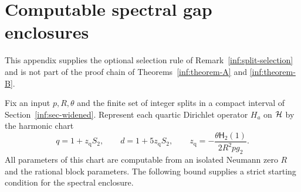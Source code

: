 \section{Computable spectral gap enclosures}\label{inf:sec-gap-enclosures}

This appendix supplies the optional selection rule of
Remark~\ref{inf:split-selection} and is not part of the proof
chain of Theorems~\ref{inf:theorem-A} and \ref{inf:theorem-B}.

Fix an input $p,R,\theta$ and the finite set of integer splits in a
compact interval of Section~\ref{inf:sec-widened}. Represent each
quartic Dirichlet operator $H_a$ on $\mathcal{H}$ by the harmonic chart
\[
 q=1+z_{\mathrm q}S_2,\qquad d=1+5z_{\mathrm q}S_2,\qquad
 z_{\mathrm q}=-\frac{\theta\mathsf H_2(1)}{2R^2pg_2}.
\]
All parameters of this chart are computable from an isolated
Neumann zero $R$ and the rational block parameters. The following
bound supplies a strict starting condition for the spectral enclosure.

